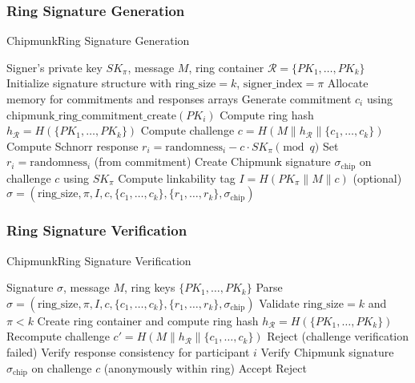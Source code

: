 \documentclass[11pt,a4paper]{article}
\begin{document}
\subsubsection{Ring Signature Generation}
\begin{algorithm}
\caption{ChipmunkRing Signature Generation}
\begin{algorithmic}[1]
\REQUIRE Signer's private key $SK_\pi$, message $M$, ring container $\mathcal{R} = \{PK_1, \ldots, PK_k\}$
\STATE Initialize signature structure with $\text{ring\_size} = k$, $\text{signer\_index} = \pi$
\STATE Allocate memory for commitments and responses arrays
    \STATE Generate commitment $c_i$ using $\text{chipmunk\_ring\_commitment\_create}(PK_i)$
\ENDFOR
\STATE Compute ring hash $h_{\mathcal{R}} = H(\{PK_1, \ldots, PK_k\})$
\STATE Compute challenge $c = H(M \| h_{\mathcal{R}} \| \{c_1, \ldots, c_k\})$
        \STATE Compute Schnorr response $r_i = \text{randomness}_i - c \cdot SK_\pi \pmod{q}$
    \ELSE
        \STATE Set $r_i = \text{randomness}_i$ (from commitment)
    \ENDIF
\ENDFOR
\STATE Create Chipmunk signature $\sigma_{\text{chip}}$ on challenge $c$ using $SK_\pi$
\STATE Compute linkability tag $I = H(PK_\pi \| M \| c)$ (optional)
\RETURN $\sigma = (\text{ring\_size}, \pi, I, c, \{c_1, \ldots, c_k\}, \{r_1, \ldots, r_k\}, \sigma_{\text{chip}})$
\end{algorithmic}
\end{algorithm}

\subsubsection{Ring Signature Verification}
\begin{algorithm}
\caption{ChipmunkRing Signature Verification}
\begin{algorithmic}[1]
\REQUIRE Signature $\sigma$, message $M$, ring keys $\{PK_1, \ldots, PK_k\}$
\STATE Parse $\sigma = (\text{ring\_size}, \pi, I, c, \{c_1, \ldots, c_k\}, \{r_1, \ldots, r_k\}, \sigma_{\text{chip}})$
\STATE Validate $\text{ring\_size} = k$ and $\pi < k$
\STATE Create ring container and compute ring hash $h_{\mathcal{R}} = H(\{PK_1, \ldots, PK_k\})$
\STATE Recompute challenge $c' = H(M \| h_{\mathcal{R}} \| \{c_1, \ldots, c_k\})$
    \RETURN Reject (challenge verification failed)
\ENDIF
{}
    \STATE Verify response consistency for participant $i$
\ENDFOR
\STATE Verify Chipmunk signature $\sigma_{\text{chip}}$ on challenge $c$ (anonymously within ring)
    \RETURN Accept
\ELSE
    \RETURN Reject
\ENDIF
\end{algorithmic}
\end{algorithm}
\end{document}
